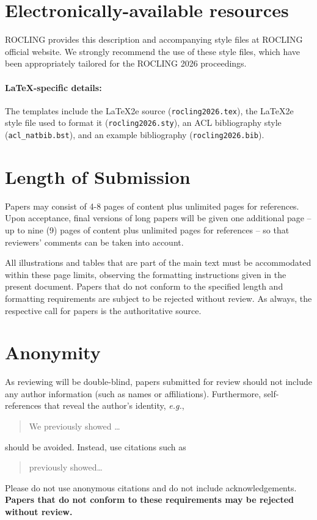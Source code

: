 \documentclass[11pt,a4paper]{article}
\begin{document}
\section{Electronically-available resources}

ROCLING provides this description and accompanying style files at ROCLING official website. We strongly recommend the use of these style files, which have been appropriately tailored for the ROCLING 2026 proceedings.

\paragraph{\LaTeX-specific details:}
The templates include the \LaTeX2e{} source (\texttt{\small rocling2026.tex}),
the \LaTeX2e{} style file used to format it (\texttt{\small rocling2026.sty}),
an ACL bibliography style (\texttt{\small acl\_natbib.bst}), and
an example bibliography (\texttt{\small rocling2026.bib}).


\section{Length of Submission}
\label{sec:length}

Papers may consist of 4-8 pages of content plus unlimited pages for references.
Upon acceptance, final versions of long papers will be given one additional page -- up to nine (9) pages of content plus unlimited pages for references -- so that reviewers' comments can be taken into account.

All illustrations and tables that are part of the main text must be accommodated within these page limits, observing the formatting instructions given in the present document.
Papers that do not conform to the specified length and formatting requirements are subject to be rejected without review.
As always, the respective call for papers is the authoritative source.


\section{Anonymity}
As reviewing will be double-blind, papers submitted for review should not include any author information (such as names or affiliations). Furthermore, self-references that reveal the author's identity, \emph{e.g.},
\begin{quote}
We previously showed \citep{Gusfield:97} \ldots
\end{quote}
should be avoided. Instead, use citations such as 
\begin{quote}
\citet{Gusfield:97} previously showed\ldots
\end{quote}
Please do not use anonymous citations and do not include acknowledgements.
\textbf{Papers that do not conform to these requirements may be rejected without review.}
\end{document}
